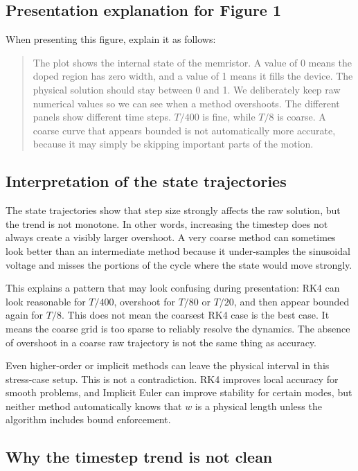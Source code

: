\documentclass[11pt]{article}
\begin{document}
\subsection{Presentation explanation for Figure 1}

When presenting this figure, explain it as follows:
\begin{quote}
The plot shows the internal state of the memristor. A value of 0 means the doped region has zero width, and a value of 1 means it fills the device. The physical solution should stay between 0 and 1. We deliberately keep raw numerical values so we can see when a method overshoots. The different panels show different time steps. \(T/400\) is fine, while \(T/8\) is coarse. A coarse curve that appears bounded is not automatically more accurate, because it may simply be skipping important parts of the motion.
\end{quote}

\subsection{Interpretation of the state trajectories}

The state trajectories show that step size strongly affects the raw solution, but the trend is not monotone. In other words, increasing the timestep does not always create a visibly larger overshoot. A very coarse method can sometimes look better than an intermediate method because it under-samples the sinusoidal voltage and misses the portions of the cycle where the state would move strongly.

This explains a pattern that may look confusing during presentation: RK4 can look reasonable for \(T/400\), overshoot for \(T/80\) or \(T/20\), and then appear bounded again for \(T/8\). This does not mean the coarsest RK4 case is the best case. It means the coarse grid is too sparse to reliably resolve the dynamics. The absence of overshoot in a coarse raw trajectory is not the same thing as accuracy.

Even higher-order or implicit methods can leave the physical interval in this stress-case setup. This is not a contradiction. RK4 improves local accuracy for smooth problems, and Implicit Euler can improve stability for certain modes, but neither method automatically knows that \(w\) is a physical length unless the algorithm includes bound enforcement.

\subsection{Why the timestep trend is not clean}
\end{document}
